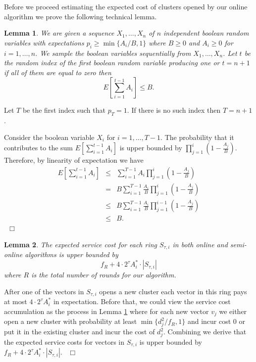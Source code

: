 \documentclass[11pt,twoside]{article}
\newtheorem{lemma}{Lemma}
\newenvironment{proof}{\medskip\noindent {\bf Proof.}}{~\hfill$\Box$\medskip}
\begin{document}
Before we proceed estimating the expected cost of clusters opened by our online algorithm we prove the following technical lemma.
\begin{lemma}\label{random}
We are given a sequence $X_1,\dots, X_n$ of $n$ independent boolean random variables with expectations  $p_i\ge \min\{A_i/B,1\}$ where $B\ge 0$ and $A_i\ge 0$   for $i=1,\dots,n$.  We sample the boolean variables sequentially from
$X_1,\dots, X_n$.
Let $t$ be the random index of the first boolean random variable producing one or $t=n+1$ if all of them are equal to zero  then
$$E\left[\sum_{i=1}^{t-1}A_i\right]\le B.$$
\end{lemma}
\begin{proof}
Let $T$ be the first index such that $p_T=1$. If there is no such index then $T=n+1$.

Consider the boolean variable $X_i$ for $i=1,\dots, T-1$. The probability that it contributes to the sum $E\left[\sum_{i=1}^{t-1}A_i\right]$ is upper bounded by  $\prod_{j=1}^i\left(1-\frac{A_j}{B}\right)$. Therefore, by linearity of expectation we have
\begin{eqnarray*}
E\left[\sum_{i=1}^{t-1}A_i\right]&\le& \sum_{i=1}^{T-1}A_i\prod_{j=1}^i\left(1-\frac{A_j}{B}\right)\\
&=&B\sum_{i=1}^{T-1}\frac{A_i}{B}\prod_{j=1}^i\left(1-\frac{A_j}{B}\right)\\
&\le& B \sum_{i=1}^{T-1}\frac{A_i}{B}\prod_{j=1}^{i-1}\left(1-\frac{A_j}{B}\right)\\
&\le& B.
\end{eqnarray*}
\end{proof}
\begin{lemma}\label{ring}
The expected service cost for each ring $S_{\tau,i}$ in both online and semi-online algorithms is upper bounded by 
$$f_R+ 4\cdot 2^{\tau}A_i^*\cdot |S_{\tau,i}|$$
where $R$ is the total number of rounds for our algorithm.
\end{lemma}
\begin{proof}
After one of the vectors in $S_{\tau,i}$ opens a new cluster each  vector in this ring pays at most $4\cdot 2^{\tau}A_i^*$ in expectation. Before that, we could view the service cost accumulation as the process in Lemma \ref{random} where for each new vector $v_j$ we either open a new cluster with probability at least  $\min\{d^2_j/f_R,1\}$ and incur cost $0$ or put it in the existing cluster and incur the cost of $d^2_j$. Combining we derive that the expected service costs for vectors in $S_{\tau,i}$ is upper bounded by $f_R+ 4\cdot 2^{\tau}A_i^*\cdot |S_{\tau,i}|$.
\end{proof}
\end{document}
